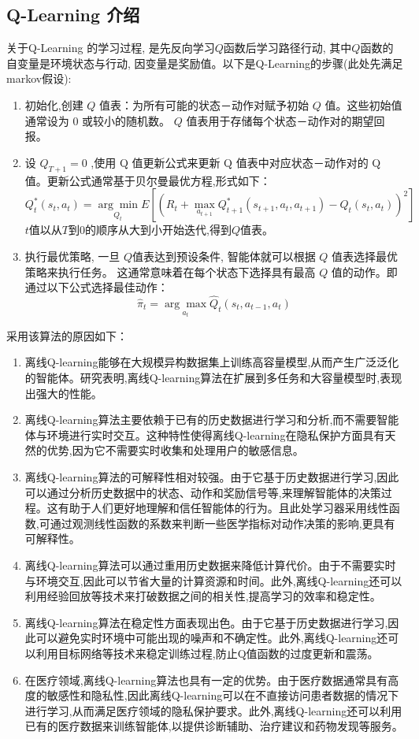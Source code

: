 \documentclass[12pt,a4paper]{ctexart}
\newenvironment{enu}{\begin{enumerate}[(1)]}{\end{enumerate}}
\theoremstyle{definition}
\begin{document}
\subsection{Q-Learning 介绍}
关于Q-Learning 的学习过程, 是先反向学习$Q$函数后学习路径行动, 
其中$Q$函数的自变量是环境状态与行动, 因变量是奖励值。以下是Q-Learning的步骤(此处先满足markov假设):
\begin{enu}
\item 初始化,创建 $Q$ 值表：为所有可能的状态－动作对赋予初始 $Q$ 值。这些初始值通常设为 0 或较小的随机数。 $Q$ 值表用于存储每个状态－动作对的期望回报。
\item 设 $\hat{Q}_{T+1}=0$ ,使用 Q 值更新公式来更新 Q 值表中对应状态－动作对的 Q 值。更新公式通常基于贝尔曼最优方程,形式如下：
$$
Q_t^*\left(s_t, a_t\right)=\underset{Q_t}{\arg \min } E\left[\left(R_t+\max _{a_{t+1}} Q_{t+1}^*\left(s_{t+1}, a_t, a_{t+1}\right)-Q_t\left(s_t, a_t\right)\right)^2\right]
$$
$t$值以从$T$到$0$的顺序从大到小开始迭代,得到$Q$值表。
\item 执行最优策略, 一旦 $Q$值表达到预设条件, 
智能体就可以根据 $Q$ 值表选择最优策略来执行任务。
这通常意味着在每个状态下选择具有最高 $Q$ 值的动作。即通过以下公式选择最佳动作：
$$
\hat{\pi}_t=\underset{a_t}{\arg \max } \hat{Q}_t\left(s_t, a_{t-1}, a_t\right)
$$
    
\end{enu}
采用该算法的原因如下：
\begin{enu} 
\item 离线Q-learning能够在大规模异构数据集上训练高容量模型,从而产生广泛泛化的智能体。研究表明,离线Q-learning算法在扩展到多任务和大容量模型时,表现出强大的性能。
\item 离线Q-learning算法主要依赖于已有的历史数据进行学习和分析,而不需要智能体与环境进行实时交互。这种特性使得离线Q-learning在隐私保护方面具有天然的优势,因为它不需要实时收集和处理用户的敏感信息。
\item 离线Q-learning算法的可解释性相对较强。由于它基于历史数据进行学习,因此可以通过分析历史数据中的状态、动作和奖励信号等,来理解智能体的决策过程。这有助于人们更好地理解和信任智能体的行为。且此处学习器采用线性函数,可通过观测线性函数的系数来判断一些医学指标对动作决策的影响,更具有可解释性。
\item 离线Q-learning算法可以通过重用历史数据来降低计算代价。由于不需要实时与环境交互,因此可以节省大量的计算资源和时间。此外,离线Q-learning还可以利用经验回放等技术来打破数据之间的相关性,提高学习的效率和稳定性。
\item 离线Q-learning算法在稳定性方面表现出色。由于它基于历史数据进行学习,因此可以避免实时环境中可能出现的噪声和不确定性。此外,离线Q-learning还可以利用目标网络等技术来稳定训练过程,防止Q值函数的过度更新和震荡。
\item 在医疗领域,离线Q-learning算法也具有一定的优势。由于医疗数据通常具有高度的敏感性和隐私性,因此离线Q-learning可以在不直接访问患者数据的情况下进行学习,从而满足医疗领域的隐私保护要求。此外,离线Q-learning还可以利用已有的医疗数据来训练智能体,以提供诊断辅助、治疗建议和药物发现等服务。
\end{enu}
\end{document}
